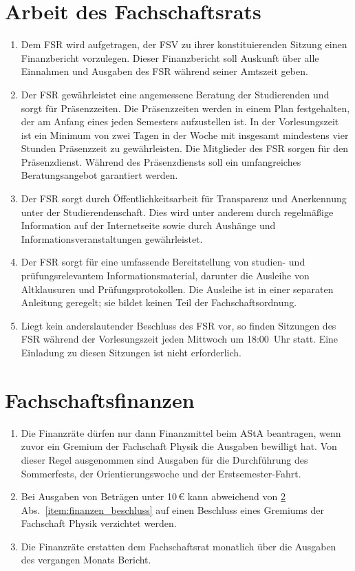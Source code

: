 \section{Arbeit des Fachschaftsrats}
\begin{enumerate}
	\item Dem FSR wird aufgetragen, der FSV zu ihrer konstituierenden Sitzung einen Finanzbericht vorzulegen.
	Dieser Finanzbericht soll Auskunft über alle Einnahmen und Ausgaben des FSR während seiner Amtszeit geben.
	\item Der FSR gewährleistet eine angemessene Beratung der Studierenden und sorgt für Präsenzzeiten.
	Die Präsenzzeiten werden in einem Plan festgehalten, der am Anfang eines jeden Semesters aufzustellen ist.
	In der Vorlesungszeit ist ein Minimum von zwei Tagen in der Woche mit insgesamt mindestens vier Stunden Präsenzzeit zu gewährleisten.
	Die Mitglieder des FSR sorgen für den Präsenzdienst.
	Während des Präsenzdiensts soll ein umfangreiches Beratungsangebot garantiert werden.
	\item Der FSR sorgt durch Öffentlichkeitsarbeit für Transparenz und Anerkennung unter der Studierendenschaft.
	Dies wird unter anderem durch regelmäßige Information auf der Internetseite sowie durch Aushänge und Informationsveranstaltungen gewährleistet.
	\item Der FSR sorgt für eine umfassende Bereitstellung von studien- und prüfungsrelevantem Informationsmaterial, darunter die Ausleihe von Altklausuren und Prüfungsprotokollen.
	Die Ausleihe ist in einer separaten Anleitung geregelt; sie bildet keinen Teil der Fachschaftsordnung.
	\item Liegt kein anderslautender Beschluss des FSR vor, so finden Sitzungen des FSR während der Vorlesungszeit jeden Mittwoch um 18:00~Uhr  statt.
	Eine Einladung zu diesen Sitzungen ist nicht erforderlich.
\end{enumerate}

\section{Fachschaftsfinanzen}
\label{sec:finanzen}
\begin{enumerate}
	\item \label{item:finanzen_beschluss}
Die Finanzräte dürfen nur dann Finanzmittel beim AStA beantragen, wenn zuvor ein Gremium der Fachschaft Physik die Ausgaben bewilligt hat.
	Von dieser Regel ausgenommen sind Ausgaben für die Durchführung des Sommerfests, der Orientierungswoche und der Erstsemester-Fahrt.
	\item Bei Ausgaben von Beträgen unter 10\,€ kann abweichend von \ref{sec:finanzen} Abs.~\ref{item:finanzen_beschluss} auf einen Beschluss eines Gremiums der Fachschaft Physik verzichtet werden.
	\item Die Finanzräte erstatten dem Fachschaftsrat monatlich über die Ausgaben des vergangen Monats Bericht.
\end{enumerate}

